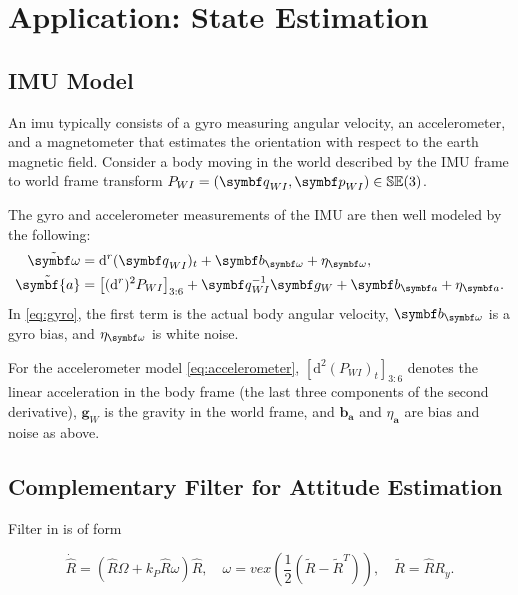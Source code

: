 
\chapter{Application: State Estimation}

\section{IMU Model}

An imu typically consists of a gyro measuring angular velocity, an accelerometer, and a magnetometer that estimates the orientation with respect to the earth magnetic field. Consider a body moving in the world described by the IMU frame to world frame transform $P_{WI} = (\bq_{WI}, \bp_{WI}) \in \mathbb{SE}(3)$.

The gyro and accelerometer measurements of the IMU are then well modeled by the following:
\begin{subequations}
  \begin{align}
    \label{eq:gyro}  \tilde \bomega              & = \mathrm{d}^r (\bq_{WI})_t + \symbf b_\bomega + \eta_\bomega,                                                     \\
    \label{eq:accelerometer} \tilde {\symbf {a}} & = \left[ (\mathrm{d}^r)^2 P_{WI} \right]_{3:6} + \bq_{WI}^{-1} \symbf g_W + \symbf b_{\symbf a} + \eta_{\symbf a}.
  \end{align}
\end{subequations}
In \eqref{eq:gyro}, the first term is the actual body angular velocity, $\symbf b_\bomega$ is a gyro bias, and $\eta_\bomega$ is white noise.

For the accelerometer model \eqref{eq:accelerometer}, $\left[ \mathrm{d}^2 (P_{WI})_t \right]_{3:6}$ denotes the linear acceleration in the body frame (the last three components of the second derivative), $\symbf g_W$ is the gravity in the world frame, and $\symbf b_{\symbf a}$ and $\eta_{\symbf a}$ are bias and noise as above.


\section{Complementary Filter for Attitude Estimation}

Filter in \cite{mahony_nonlinear_2008} is of form

$$
  \dot {\hat R} = (\hat R \Omega + k_P \hat R \omega) \hat R, \quad \omega = vex \left( \frac{1}{2} \left( \tilde R - \tilde R^T \right) \right), \quad \tilde R = \hat R R_y.
$$

